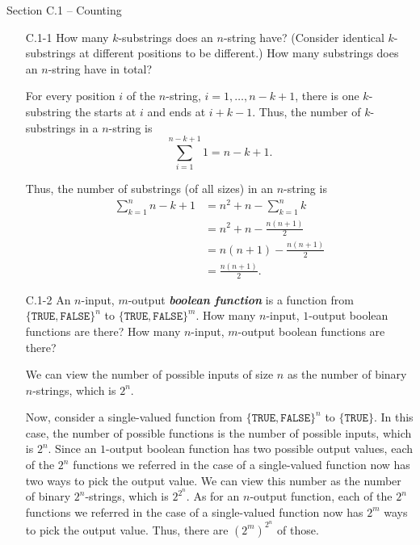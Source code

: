 
{\large Section C.1 {--} Counting}

\begin{enumerate}

\item[C.1{-}1] {How many $k$-substrings does an $n$-string have? (Consider
identical $k$-substrings at different positions to be different.) How many
substrings does an $n$-string have in total?}

\begin{framed}
For every position $i$ of the $n$-string, $i = 1, \dots, n - k + 1$, there is
one $k$-substring the starts at $i$ and ends at $i + k - 1$. Thus, the number of
$k$-substrings in a $n$-string is
\[
  \sum_{i = 1}^{n - k + 1} 1 = n - k + 1.
\]

Thus, the number of substrings (of all sizes) in an $n$-string is
\begin{equation*}
\begin{aligned}
  \sum_{k = 1}^{n} n - k + 1 &= n^2 + n - \sum_{k = 1}^{n} {k}\\
                             &= n^2 + n - \frac{n (n + 1)}{2}\\
                             &= n (n + 1) - \frac{n (n + 1)}{2}\\
                             &= \frac{n (n + 1)}{2}.
\end{aligned}
\end{equation*}
\end{framed}

\item[C.1{-}2] {An $n$-input, $m$-output \textbf{\emph{boolean function}} is
a function from $\{\texttt{TRUE}, \texttt{FALSE}\}^n$ to
$\{\texttt{TRUE}, \texttt{FALSE}\}^m$. How many $n$-input, $1$-output boolean
functions are there? How many $n$-input, $m$-output boolean functions are
there?}

\begin{framed}
We can view the number of possible inputs of size $n$ as the number of binary
$n$-strings, which is $2^n$.

Now, consider a single-valued function from $\{\texttt{TRUE},
\texttt{FALSE}\}^n$ to $\{\texttt{TRUE}\}$. In this case, the number of
possible functions is the number of possible inputs, which is $2^n$. Since an
$1$-output boolean function has two possible output values, each of the $2^n$
functions we referred in the case of a single-valued function now has two ways
to pick the output value. We can view this number as the number of binary
$2^n$-strings, which is $2^{2^n}$. As for an $n$-output function, each of the
$2^n$ functions we referred in the case of a single-valued function now has
$2^m$ ways to pick the output value. Thus, there are $({2^m})^{2^n}$ of those.
\end{framed}


\end{enumerate}
